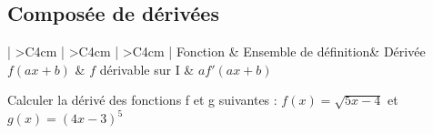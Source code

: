 \subsection{Composée de dérivées}
\begin{center}
    \setlength{\arrayrulewidth}{1pt}
    \renewcommand{\arraystretch}{1.9}
    \begin{tabular}{| >{}C{4cm} | >{}C{4cm} | >{}C{4cm} | }
    	\hline Fonction & Ensemble de définition& Dérivée  \\
    	\hline$f(ax+b)$ & $f$ dérivable sur I & $af'(ax+b)$ \\
    	\hline
    \end{tabular}
\end{center}
\begin{bmethode}
    Calculer la dérivé des fonctions f et g suivantes : $f(x)=\sqrt{5x-4}$ et $g(x)=(4x-3)^5$\\		
    \pointille[\textwidth-1cm]
\end{bmethode}


